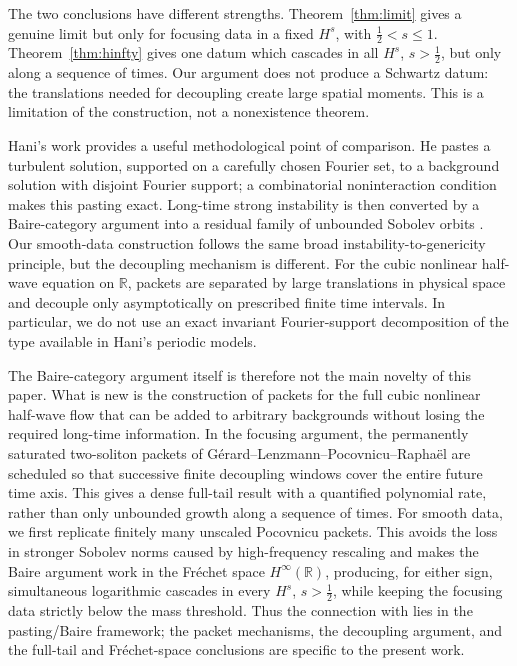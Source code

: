 \documentclass[10pt,a4paper]{amsart}
\numberwithin{equation}{section}
\newcommand{\half}{\frac12}
\begin{document}
The two conclusions have different strengths.  Theorem~\ref{thm:limit} gives a
genuine limit but only for focusing data in a fixed $H^s$, with
$\half<s\leq1$.  Theorem~\ref{thm:hinfty} gives one datum which cascades in all
$H^s$, $s>\half$, but only along a sequence of times.  Our argument does not
produce a Schwartz datum: the translations needed for decoupling create large
spatial moments.  This is a limitation of the construction, not a
nonexistence theorem.

Hani's work \cite{Hani} provides a useful methodological point of comparison. He pastes a turbulent solution, supported on a carefully chosen Fourier set, to a background solution with disjoint Fourier support; a combinatorial noninteraction condition makes this pasting exact. Long-time strong instability is then converted by a Baire-category argument into a residual family of unbounded Sobolev orbits \cite{Hani}. Our smooth-data construction follows the same broad instability-to-genericity principle, but the decoupling mechanism is different. For the cubic nonlinear half-wave equation on \(\mathbb R\), packets are separated by large translations in physical space and decouple only asymptotically on prescribed finite time intervals. In particular, we do not use an exact invariant Fourier-support decomposition of the type available in Hani's periodic models.

The Baire-category argument itself is therefore not the main novelty of this paper. What is new is the construction of packets for the full cubic nonlinear half-wave flow that can be added to arbitrary backgrounds without losing the required long-time information. In the focusing argument, the permanently saturated two-soliton packets of G\'erard--Lenzmann--Pocovnicu--Rapha\"el \cite{GLPR} are scheduled so that successive finite decoupling windows cover the entire future time axis. This gives a dense full-tail result with a quantified polynomial rate, rather than only unbounded growth along a sequence of times. For smooth data, we first replicate finitely many unscaled Pocovnicu packets. This avoids the loss in stronger Sobolev norms caused by high-frequency rescaling and makes the Baire argument work in the Fr\'echet space \(H^\infty(\mathbb R)\), producing, for either sign, simultaneous logarithmic cascades in every \(H^s\), \(s>\frac12\), while keeping the focusing data strictly below the mass threshold. Thus the connection with \cite{Hani} lies in the pasting/Baire framework; the packet mechanisms, the decoupling argument, and the full-tail and Fr\'echet-space conclusions are specific to the present work.
\end{document}
